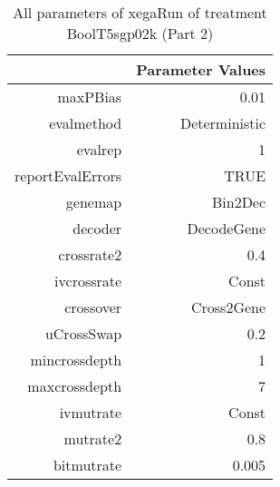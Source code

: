 \begin{table}[ht]
\centering
\begin{tabular}{rr}
  \hline
 & Parameter Values \\ 
  \hline
maxPBias & 0.01 \\ 
  evalmethod & Deterministic \\ 
  evalrep & 1 \\ 
  reportEvalErrors & TRUE \\ 
  genemap & Bin2Dec \\ 
  decoder & DecodeGene \\ 
  crossrate2 & 0.4 \\ 
  ivcrossrate & Const \\ 
  crossover & Cross2Gene \\ 
  uCrossSwap & 0.2 \\ 
  mincrossdepth & 1 \\ 
  maxcrossdepth & 7 \\ 
  ivmutrate & Const \\ 
  mutrate2 & 0.8 \\ 
  bitmutrate & 0.005 \\ 
   \hline
\end{tabular}
\caption{ All parameters of xegaRun of treatment BoolT5sgp02k 
 (Part 2)} 
\end{table}
